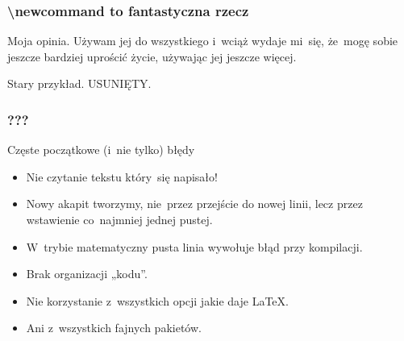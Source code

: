 \documentclass[10pt,t]{beamer}
\begin{document}
\begin{frame}[fragile]
  \frametitle{\textbackslash newcommand to fantastyczna rzecz}


  Moja opinia. Używam jej do wszystkiego i~wciąż wydaje mi~się, że~mogę
  sobie jeszcze bardziej uprościć życie, używając jej jeszcze więcej.

  Stary przykład. USUNIĘTY.

\end{frame}





\begin{frame}
  \frametitle{???}


  Częste początkowe (i~nie tylko) błędy
  \begin{itemize}
    \RaggedRight

  \item {\Large \color{red} Nie czytanie tekstu który~się napisało!}

  \item Nowy akapit tworzymy, nie~przez przejście do nowej linii, lecz
    przez wstawienie co~najmniej jednej pustej.

  \item W~trybie matematyczny pusta linia wywołuje błąd przy kompilacji.

  \item Brak organizacji „kodu”.

  \item Nie korzystanie z~wszystkich opcji jakie daje \LaTeX.

  \item Ani z~wszystkich fajnych pakietów.

  \end{itemize}

\end{frame}
\end{document}
